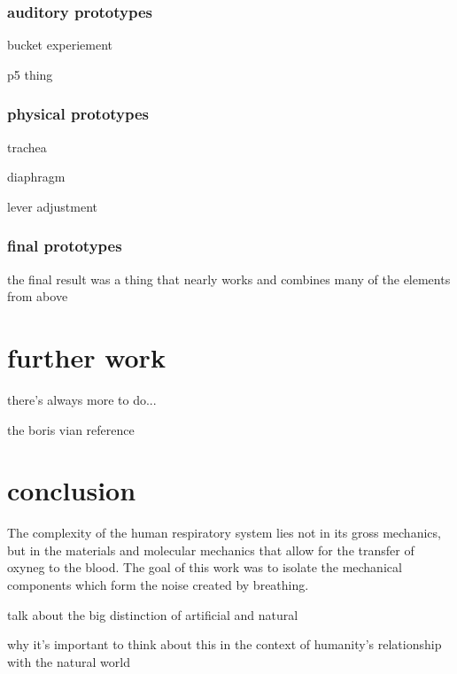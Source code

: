 \documentclass[letterpaper]{article}
\begin{document}
\subsubsection{auditory prototypes}

bucket experiement

p5 thing

\subsubsection{physical prototypes}

trachea

diaphragm

lever adjustment

\subsubsection{final prototypes}

the final result was a thing that nearly works and combines many of the elements from above

\section{further work}

there's always more to do...

the boris vian reference 


\section{conclusion}

The complexity of the human respiratory system lies not in its gross mechanics, but in the materials and molecular mechanics that allow for the transfer of oxyneg to the blood. The goal of this work was to isolate the mechanical components which form the noise created by breathing.  


talk about the big distinction of artificial and natural

why it's important to think about this in the context of humanity's relationship with the natural world


%
\end{document}
